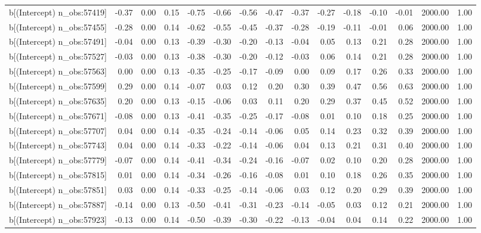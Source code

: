 \begin{table}[ht]
\begin{tabular}{rrrrrrrrrrrrrrr}
  b[(Intercept) n\_obs:57419] & -0.37 & 0.00 & 0.15 & -0.75 & -0.66 & -0.56 & -0.47 & -0.37 & -0.27 & -0.18 & -0.10 & -0.01 & 2000.00 & 1.00 \\ 
  b[(Intercept) n\_obs:57455] & -0.28 & 0.00 & 0.14 & -0.62 & -0.55 & -0.45 & -0.37 & -0.28 & -0.19 & -0.11 & -0.01 & 0.06 & 2000.00 & 1.00 \\ 
  b[(Intercept) n\_obs:57491] & -0.04 & 0.00 & 0.13 & -0.39 & -0.30 & -0.20 & -0.13 & -0.04 & 0.05 & 0.13 & 0.21 & 0.28 & 2000.00 & 1.00 \\ 
  b[(Intercept) n\_obs:57527] & -0.03 & 0.00 & 0.13 & -0.38 & -0.30 & -0.20 & -0.12 & -0.03 & 0.06 & 0.14 & 0.21 & 0.28 & 2000.00 & 1.00 \\ 
  b[(Intercept) n\_obs:57563] & 0.00 & 0.00 & 0.13 & -0.35 & -0.25 & -0.17 & -0.09 & 0.00 & 0.09 & 0.17 & 0.26 & 0.33 & 2000.00 & 1.00 \\ 
  b[(Intercept) n\_obs:57599] & 0.29 & 0.00 & 0.14 & -0.07 & 0.03 & 0.12 & 0.20 & 0.30 & 0.39 & 0.47 & 0.56 & 0.63 & 2000.00 & 1.00 \\ 
  b[(Intercept) n\_obs:57635] & 0.20 & 0.00 & 0.13 & -0.15 & -0.06 & 0.03 & 0.11 & 0.20 & 0.29 & 0.37 & 0.45 & 0.52 & 2000.00 & 1.00 \\ 
  b[(Intercept) n\_obs:57671] & -0.08 & 0.00 & 0.13 & -0.41 & -0.35 & -0.25 & -0.17 & -0.08 & 0.01 & 0.10 & 0.18 & 0.25 & 2000.00 & 1.00 \\ 
  b[(Intercept) n\_obs:57707] & 0.04 & 0.00 & 0.14 & -0.35 & -0.24 & -0.14 & -0.06 & 0.05 & 0.14 & 0.23 & 0.32 & 0.39 & 2000.00 & 1.00 \\ 
  b[(Intercept) n\_obs:57743] & 0.04 & 0.00 & 0.14 & -0.33 & -0.22 & -0.14 & -0.06 & 0.04 & 0.13 & 0.21 & 0.31 & 0.40 & 2000.00 & 1.00 \\ 
  b[(Intercept) n\_obs:57779] & -0.07 & 0.00 & 0.14 & -0.41 & -0.34 & -0.24 & -0.16 & -0.07 & 0.02 & 0.10 & 0.20 & 0.28 & 2000.00 & 1.00 \\ 
  b[(Intercept) n\_obs:57815] & 0.01 & 0.00 & 0.14 & -0.34 & -0.26 & -0.16 & -0.08 & 0.01 & 0.10 & 0.18 & 0.26 & 0.35 & 2000.00 & 1.00 \\ 
  b[(Intercept) n\_obs:57851] & 0.03 & 0.00 & 0.14 & -0.33 & -0.25 & -0.14 & -0.06 & 0.03 & 0.12 & 0.20 & 0.29 & 0.39 & 2000.00 & 1.00 \\ 
  b[(Intercept) n\_obs:57887] & -0.14 & 0.00 & 0.13 & -0.50 & -0.41 & -0.31 & -0.23 & -0.14 & -0.05 & 0.03 & 0.12 & 0.21 & 2000.00 & 1.00 \\ 
  b[(Intercept) n\_obs:57923] & -0.13 & 0.00 & 0.14 & -0.50 & -0.39 & -0.30 & -0.22 & -0.13 & -0.04 & 0.04 & 0.14 & 0.22 & 2000.00 & 1.00 \\ 

\end{tabular}
\end{table}
